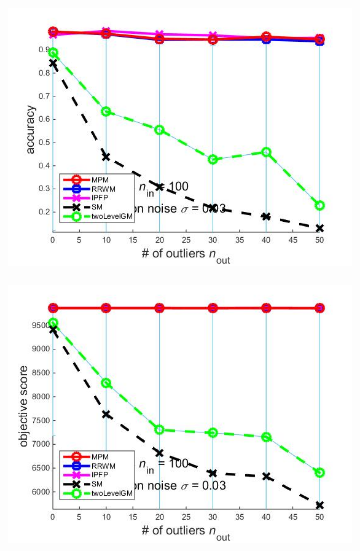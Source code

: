 \documentclass[
	fontsize=12pt,
	paper=a4,
	twoside=false,
	numbers=noenddot,
	plainheadsepline,
	toc=listof,
	toc=bibliography
]{scrartcl}
\begin{document}
\begin{figure}[h] 
	\begin{subfigure}[b]{0.3\textwidth}
		\centering
		\includegraphics[scale=0.25]{"fig_ver2608/syntheticPointSets/ver4.2/outliertest_n50/accuracy_avg10t"} 
	\end{subfigure}%
	\begin{subfigure}[b]{0.3\textwidth}
		\centering
		\includegraphics[scale=0.25]{"fig_ver2608/syntheticPointSets/ver4.2/outliertest_n50/score_avg10t"} 
	\end{subfigure} 
	\begin{subfigure}[b]{0.3\textwidth}
		\centering

\end{subfigure}
\end{figure}
\end{document}
